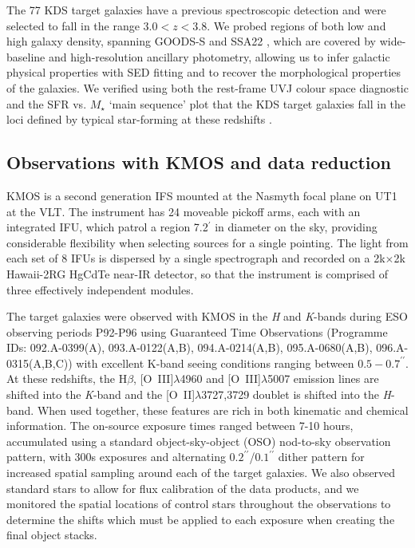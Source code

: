 \documentclass[fleqn,usenatbib]{mnras}
\begin{document}
The 77 KDS target galaxies have a previous spectroscopic detection and were selected to fall in the range $3.0 < z < 3.8$.
We probed regions of both low and high galaxy density, spanning GOODS-S \citep[e.g.][]{Koekemoer2011,Grogin2011,Guo2013} and SSA22 \citep[e.g.][]{Steidel1998}, which are covered by wide-baseline and high-resolution ancillary photometry, allowing us to infer galactic physical properties with SED fitting and to recover the morphological properties of the galaxies.
We verified using both the rest-frame UVJ colour space diagnostic and the SFR vs. $M_{\star}$ `main sequence' plot that the KDS target galaxies fall in the loci defined by typical star-forming at these redshifts \cite{Turner2017}. 
\subsection{Observations with KMOS and data reduction}\label{subsec:kmos_observations}
KMOS is a second generation IFS mounted at the Nasmyth focal plane on UT1 at the VLT.
The instrument has 24 moveable pickoff arms, each with an integrated IFU, which patrol a region 7.2$^{\prime}$ in diameter on the sky, providing considerable flexibility when selecting sources for a single pointing.
The light from each set of 8 IFUs is dispersed by a single spectrograph and recorded on a 2k$\times$2k Hawaii-2RG HgCdTe near-IR detector, so that the instrument is comprised of three effectively independent modules.

The target galaxies were observed with KMOS in the {\it H} and {\it K}-bands during ESO observing periods P92-P96 using Guaranteed Time Observations (Programme IDs: 092.A-0399(A), 093.A-0122(A,B), 094.A-0214(A,B), 095.A-0680(A,B), 096.A-0315(A,B,C)) with excellent K-band seeing conditions ranging between $0.5-0.7^{\prime\prime}$.
At these redshifts, the H$\beta$,  [O~{\sc III}]$\lambda$4960 and  [O~{\sc III}]$\lambda$5007 emission lines are shifted into the {\it K}-band and the [O~{\sc II}]$\lambda$3727,3729 doublet is shifted into the {\it H}-band.
When used together, these features are rich in both kinematic and chemical information.
The on-source exposure times ranged between 7-10 hours, accumulated using a standard object-sky-object (OSO) nod-to-sky observation pattern, with 300s exposures and alternating $0.2^{\prime\prime}$/$0.1^{\prime\prime}$ dither pattern for increased spatial sampling around each of the target galaxies.
We also observed standard stars to allow for flux calibration of the data products, and we monitored the spatial locations of control stars throughout the observations to determine the shifts which must be applied to each exposure when creating the final object stacks. \\ 
\end{document}
